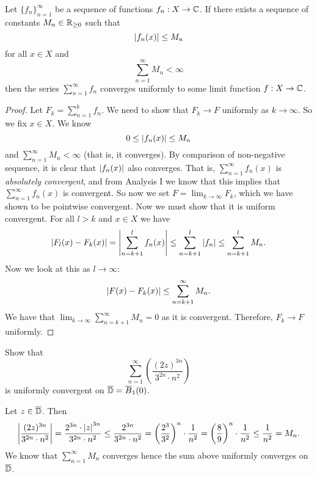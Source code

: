 
\begin{theorem}
    Let $\{f_n\}_{n = 1}^\infty$ be a sequence of functions $f_n: X \to \mathbb{C}$. 
    If there exists a sequence of constants $M_n \in \mathbb{R}_{\geq 0}$ such that 
    \[\left\lvert f_n(x)\right\rvert \leq M_n\]
    for all $x \in X$ and
    \[\sum_{n = 1}^\infty M_n < \infty\]
    then the series $\sum_{n = 1}^\infty f_n$ converges uniformly to some limit function $f: X \to \mathbb{C}$.
\end{theorem}

\begin{proof}
    Let $F_k = \sum_{n = 1}^k f_n$. 
    We need to show that $F_k \to F$ uniformly as $k \to \infty$. 
    So we fix $x \in X$. 
    We know
    \[0 \leq \left\lvert f_n(x)\right\rvert \leq M_n\]
    and $\sum_{n = 1}^\infty M_n < \infty$ (that is, it converges).
    By comparison of non-negative sequence, it is clear that $\left\lvert f_n(x)\right\rvert$ also converges.
    That is, $\sum_{n = 1}^\infty f_n(x)$ is \emph{absolutely convergent}, and from Analysis I we know that this implies that $\sum_{n = 1}^\infty f_n(x)$ is convergent.
    So now we set $F = \lim_{k \to \infty} F_k$, which we have shown to be pointwise convergent. 
    Now we must show that it is uniform convergent.
    For all $l > k$ and $x \in X$ we have
    \[\left\lvert F_l(x) - F_k(x)\right\rvert = \left\lvert\sum_{n = k + 1}^l f_n(x)\right\rvert \leq \sum_{n = k + 1}^l \left\lvert f_n\right\rvert \leq \sum_{n = k+1}^l M_n.\]
    Now we look at this as $l \to \infty$:
    \[ \left\lvert F(x) - F_k(x)\right\rvert \leq \sum_{n = k + 1}^\infty M_n.\]
    We have that $\lim_{k \to \infty} \sum_{n = k + 1}^\infty M_n = 0$ as it is convergent.
    Therefore, $F_k \to F$ uniformly. 
\end{proof}

\begin{example}
    Show that
    \[\sum_{n = 1}^\infty \left(\frac{(2z)^{3n}}{3^{2n}\cdot n^2}\right)\]
    is uniformly convergent on $\overline {\mathbb{D}} = \overline B_1(0)$.
\end{example}

\begin{solution}
    Let $z \in \overline {\mathbb{D}}$. Then 
    \[ \left\lvert\frac{(2z)^{3n}}{3^{2n}\cdot n^2}\right\rvert = \frac{2^{3n}\cdot \left\lvert z\right\rvert^{3n}}{3^{2n}\cdot n^2} \leq \frac{2^{3n}}{3^{2n}\cdot n^2} = \left(\frac{2^3}{3^2}\right)^n \cdot \frac 1{n^2} = \left(\frac 89\right)^n \cdot \frac1{n^2} \leq \frac1{n^2} = M_n. \]
    We know that $\sum_{n = 1}^\infty M_n$ converges hence the sum above uniformly converges on $\overline {\mathbb{D}}$.
\end{solution}

